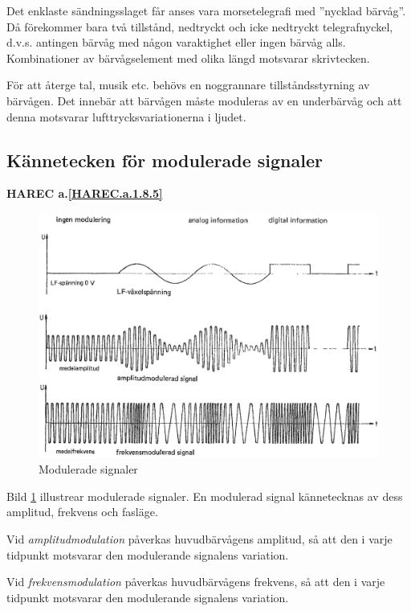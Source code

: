 Det enklaste sändningsslaget får anses vara morsetelegrafi med
''nycklad bärvåg''.
Då förekommer bara två tillstånd, nedtryckt och icke nedtryckt telegrafnyckel,
d.v.s. antingen bärvåg med någon varaktighet eller ingen bärvåg alls.
Kombinationer av bärvågselement med olika längd motsvarar skrivtecken.

För att återge tal, musik etc. behövs en noggrannare tillståndsstyrning av
bärvågen.
Det innebär att bärvågen måste moduleras av en underbärvåg och att denna
motsvarar lufttrycksvariationerna i ljudet.

\subsection{Kännetecken för modulerade signaler}
\textbf{HAREC a.\ref{HAREC.a.1.8.5}\label{myHAREC.a.1.8.5a}}

\begin{figure}
\includegraphics[width=\textwidth]{images/cropped_pdfs/bild_2_1-22.pdf}
\caption{Modulerade signaler}
\label{fig:BildII1-22}
\end{figure}

Bild \ref{fig:BildII1-22} illustrear modulerade signaler.
En modulerad signal kännetecknas av dess amplitud, frekvens och fasläge.

Vid \emph{amplitudmodulation} påverkas huvudbärvågens amplitud, så att den i
varje tidpunkt motsvarar den modulerande signalens variation.

Vid \emph{frekvensmodulation} påverkas huvudbärvågens frekvens, så att den i
varje tidpunkt motsvarar den modulerande signalens variation.

